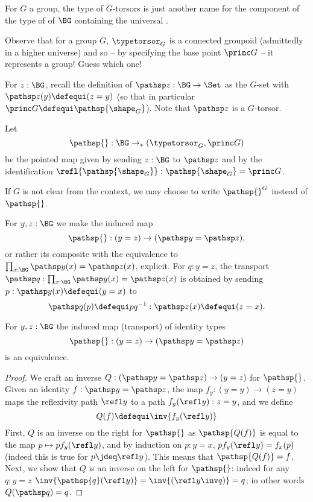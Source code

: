 \begin{remark}
  For $G$ a group, the type of $G$-torsors is just another name for the component of the type of \coverings of $\BG$ containing the universal \covering.

Observe that for a group $G$, $\typetorsor_G$ is a connected groupoid (admittedly in a higher universe) and so -- by specifying the base point $\princ G$ -- it represents a group!  Guess which one!
\end{remark}

  For $z:\BG$, recall the definition of $\pathsp z:\BG\to\Set$ as the
  $G$-set with $\pathsp z(y)\defequi(z=y)$ (so that in particular
  $\princ G\defequi\pathsp{\shape_G}$).  Note that $\pathsp z$ is a $G$-torsor.

 \begin{definition}
  \label{def:BG2TorsG} Let $$\pathsp{}:\BG\to_*(\typetorsor_G,\princ G)$$ be the pointed map given by sending $z:\BG$ to $\pathsp z$ and by the identification $\refl{\pathsp{\shape_G}}:\pathsp{\shape_G}=\princ G$.
\end{definition}
If $G$ is not clear from the context, we may choose to write $\pathsp{}^G$ instead of $\pathsp{}$.

\begin{example}\label{ex:pathsptransport}
  For $y,z:\BG$ we make the induced map
$$\pathsp{}:(y=z)\to (\pathsp y=\pathsp z),
$$
or rather its composite with the equivalence to $\prod_{x:\BG}\pathsp y(x)=\pathsp z(x)$,
explicit.
For $q:y=z$,  the transport
$\pathsp q:\prod_{x:\BG}\pathsp y(x)=\pathsp z(x)$
is obtained
by sending $p:\pathsp y(x)\defequi (y=x)$ to
$$\pathsp q(p)\defequi pq^{-1}:\pathsp z(x)\defequi(z=x).$$
\end{example}
\begin{lemma}\label{lem:pathsptransportiseq}
  For  $y,z:\BG$ the induced map  (\ie transport) of identity types
$$\pathsp{}:(y=z)\to (\pathsp y=\pathsp z)$$
is an equivalence.
\end{lemma}
\begin{proof}
  We craft an inverse $Q:(\pathsp y=\pathsp z) \to (y=z)$ for
  $\pathsp{}$. Given an identity $f:\pathsp y = \pathsp z$, the map
  $f_y: (y=y) \to (z=y)$ maps the reflexivity path $\refl y$ to a path
  $f_y(\refl y):z=y$, and we define
  \begin{displaymath}
    Q(f) \defequi \inv{f_y(\refl y)}
  \end{displaymath}
  First, $Q$ is an inverse on the right for $\pathsp{}$ as
  $\pathsp {Q(f)}$ is equal to the map $p \mapsto p f_y(\refl y)$, and
  by induction on $p:y=x$, $p f_y(\refl y) = f_x(p)$ (indeed this is
  true for $p\jdeq \refl y$). This means that $\pathsp {Q(f)} =
  f$. Next, we show that $Q$ is an inverse on the left for
  $\pathsp{}$: indeed for any $q:y=z$
  $\inv{\pathsp{q}(\refl y)} = \inv{(\refl y \inv q)} = q$; in other
  words $Q(\pathsp q)=q$.
\end{proof}


